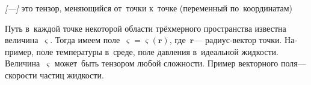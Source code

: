 

\label{para:differentiationoftensorfields}

\begin{otherlanguage}{russian}

\begin{changemargin}{\parindent}{\parindent}
\vspace{-0.15em}
\small \flushright \textit{[---]} это тензор, меняющийся от~точки к~точке (переменный по~координатам)
\par\vspace{.25em}
\end{changemargin}

\noindent Путь в~каждой точке некоторой области трёхмерного пространства
известна величина~$\varsigma$. Тогда имеем поле~${\varsigma \!=\! \varsigma(\bm{r})}$, где~$\bm{r}$\:--- радиус\hbox{-}вектор точки. Например, поле температуры в~среде, поле давления в~идеальной жидкости. Величина~$\varsigma$ может~быть тензором любой сложности. Пример векторного поля\:--- скорости частиц жидкости.

\end{otherlanguage}



